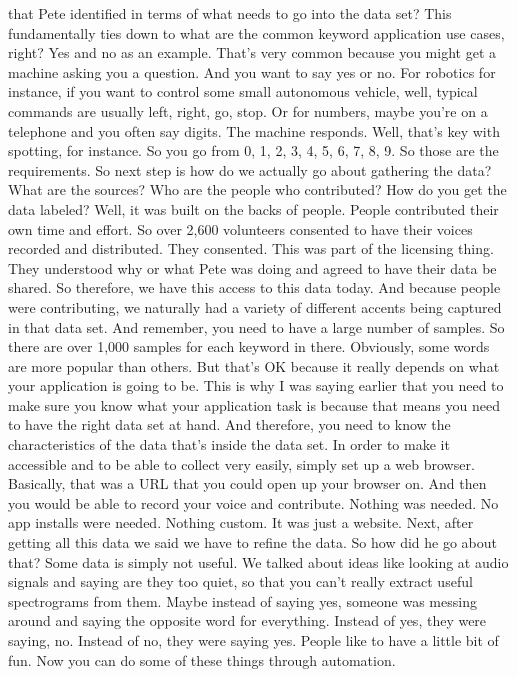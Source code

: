 that Pete identified in terms of what needs to go into the data set?
This fundamentally ties down to what are the common keyword application
use cases, right?
Yes and no as an example.
That's very common because you might get a machine asking you a question.
And you want to say yes or no.
For robotics for instance, if you want to control
some small autonomous vehicle, well, typical commands
are usually left, right, go, stop.
Or for numbers, maybe you're on a telephone and you often say digits.
The machine responds.
Well, that's key with spotting, for instance.
So you go from 0, 1, 2, 3, 4, 5, 6, 7, 8, 9.
So those are the requirements.
So next step is how do we actually go about gathering the data?
What are the sources?
Who are the people who contributed?
How do you get the data labeled?
Well, it was built on the backs of people.
People contributed their own time and effort.
So over 2,600 volunteers consented to have
their voices recorded and distributed.
They consented.
This was part of the licensing thing.
They understood why or what Pete was doing
and agreed to have their data be shared.
So therefore, we have this access to this data today.
And because people were contributing, we naturally
had a variety of different accents being captured in that data set.
And remember, you need to have a large number of samples.
So there are over 1,000 samples for each keyword in there.
Obviously, some words are more popular than others.
But that's OK because it really depends on what
your application is going to be.
This is why I was saying earlier that you
need to make sure you know what your application
task is because that means you need to have the right data set at hand.
And therefore, you need to know the characteristics
of the data that's inside the data set.
In order to make it accessible and to be able to collect very easily,
simply set up a web browser.
Basically, that was a URL that you could open up your browser on.
And then you would be able to record your voice and contribute.
Nothing was needed.
No app installs were needed.
Nothing custom.
It was just a website.
Next, after getting all this data we said we have to refine the data.
So how did he go about that?
Some data is simply not useful.
We talked about ideas like looking at audio signals
and saying are they too quiet, so that you can't really
extract useful spectrograms from them.
Maybe instead of saying yes, someone was messing around and saying
the opposite word for everything.
Instead of yes, they were saying, no.
Instead of no, they were saying yes.
People like to have a little bit of fun.
Now you can do some of these things through automation.
